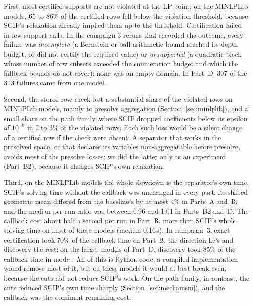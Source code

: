 First, most certified supports are not violated at the LP point: on the
MINLPLib models, 65 to 86\% of the certified rows fell below the violation
threshold, because SCIP's relaxation already implied them up to the
threshold. Certification failed in few support calls. In the campaign-3 reruns
that recorded the outcome, every failure was \emph{incomplete} (a Bernstein
or ball-arithmetic bound reached its depth budget, or did not certify the
required value) or \emph{unsupported} (a quadratic block whose number of row
subsets exceeded the enumeration budget and which the fallback bounds do not
cover); none was an empty domain. In Part~D, 307 of the 313 failures came
from one model.

Second, the stored-row check lost a substantial share of the violated rows
on MINLPLib models, mainly to presolve aggregation (Section~\ref{sec:minlplib}),
and a small share on the path family, where SCIP dropped coefficients below
its epsilon of $10^{-9}$ in 2 to 3\% of the violated rows. Each such loss would be a
silent change of a certified row if the check were absent. A separator that
works in the presolved space, or that declares its variables
non-aggregatable before presolve, avoids most of the presolve losses; we did
the latter only as an experiment (Part~B2), because it changes SCIP's own
relaxation.

Third, on the MINLPLib models the whole slowdown is the separator's own time.
SCIP's solving time without the callback was unchanged in every part: its
shifted geometric mean differed from the baseline's by at most 4\% in
Parts~A and~B, and the median per-run ratio was between 0.96 and 1.01 in
Parts~B2 and~D. The callback cost about half a second per run in Part~B, more than SCIP's whole
solving time on most of these models (median 0.16\,s). In campaign~3, exact
certification took 70\% of the callback time on Part~B, the direction LPs and
discovery the rest; on the larger models of Part~D, discovery took 85\% of the
callback time in mode . All of this is Python code; a compiled
implementation would remove most of it, but on these models it would at best
break even, because the cuts did not reduce SCIP's work. On the path family,
in contrast, the cuts reduced SCIP's own time sharply
(Section~\ref{sec:mechanism}), and the callback was the dominant remaining cost.
